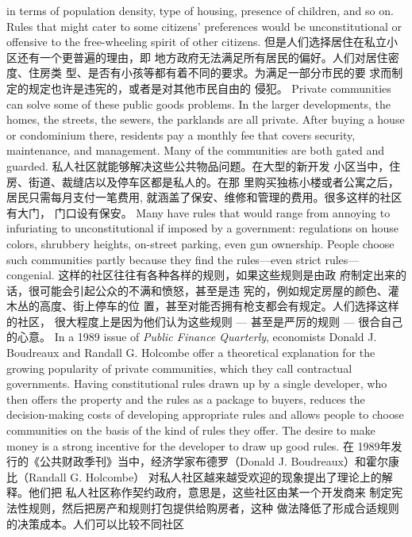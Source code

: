 \begin{paracol}{2}
in terms of population density, type of housing, presence of children, and so on. Rules that might cater to some citizens' preferences  would  be  unconstitutional  or  offensive  to  the
free-wheeling spirit of other citizens.
\switchcolumn
但是人们选择居住在私立小区还有一个更普遍的理由，即
地方政府无法满足所有居民的偏好。人们对居住密度、住房类
型、是否有小孩等都有着不同的要求。为满足一部分市民的要
求而制定的规定也许是违宪的，或者是对其他市民自由的
侵犯。
\switchcolumn*
Private communities can solve some of these public goods
problems. In the larger developments, the homes, the streets,
the sewers, the parklands are all private. After buying a house
or condominium there, residents pay a monthly fee that covers
security, maintenance, and management. Many of the communities are both gated and guarded.
\switchcolumn
私人社区就能够解决这些公共物品问题。在大型的新开发
小区当中，住房、街道、裁缝店以及停车区都是私人的。在那
里购买独栋小楼或者公寓之后，居民只需每月支付一笔费用,
就涵盖了保安、维修和管理的费用。很多这样的社区有大门，
门口设有保安。
\switchcolumn*
Many have rules that would range from annoying to infuriating to unconstitutional if imposed by a government: regulations on house colors, shrubbery heights, on-street parking,
even gun ownership. People choose such communities partly
because they find the rules---even strict rules---congenial.
\switchcolumn
这样的社区往往有各种各样的规则，如果这些规则是由政
府制定出来的话，很可能会引起公众的不满和愤怒，甚至是违
宪的，例如规定房屋的颜色、灌木丛的高度、街上停车的位
置，甚至对能否拥有枪支都会有规定。人们选择这样的社区，
很大程度上是因为他们认为这些规则 --- 甚至是严厉的规则
--- 很合自己的心意。
\switchcolumn*
In a 1989 issue of \textit{Public Finance Quarterly}, economists Donald
J. Boudreaux and Randall G. Holcombe offer a theoretical explanation for the growing popularity of private communities, which they call contractual governments. Having constitutional rules drawn up by a single developer, who then offers the
property and the rules as a package to buyers, reduces the decision-making costs of developing appropriate rules and allows
people to choose communities on the basis of the kind of rules
they offer. The desire to make money is a strong incentive for
the developer to draw up good rules.
\switchcolumn
在 1989年发行的《公共财政季刊》当中，经济学家布德罗（Donald J. Boudreaux）和霍尔康比（Randall G. Holcombe）
对私人社区越来越受欢迎的现象提出了理论上的解释。他们把
私人社区称作契约政府，意思是，这些社区由某一个开发商来
制定宪法性规则，然后把房产和规则打包提供给购房者，这种
做法降低了形成合适规则的决策成本。人们可以比较不同社区

\end{paracol}
